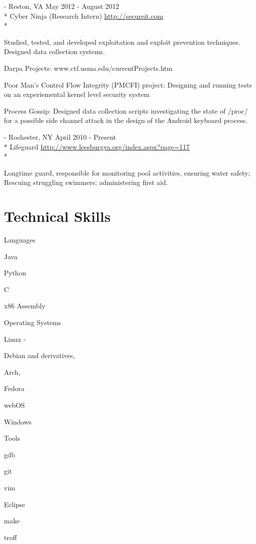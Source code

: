 \documentclass[letter,margin,line]{resume}
\newcommand{\rurl}[1]{\hfill {\footnotesize \url{#1}}}
\newcommand{\rdate}[1]{\hfill {\small #1}}
\renewcommand{\employer}[5]{\item[#1] - #2 \rdate{#3} \\* #4 \rurl{#5} \\*}
\begin{document}
\begin{resume}
\begin{asparadesc}
		\employer{SecureIT}{Reston, VA}{May 2012 - August 2012}{Cyber Ninja (Research Intern)}{http://secureit.com}

		\small
		Studied, tested, and developed exploitation and exploit prevention techniques. Designed data collection systems.
		\item Darpa Projects: \hfill www.ctf.usma.edu/currentProjects.htm
			\item Poor Man’s Control Flow Integrity (PMCFI) project: Designing and running tests on an experiemental kernel level security system
			\item Process Gossip: Designed data collection scripts investigating the state of /proc/ for a possible side channel attack in the design of the Android keyboard process.
		\normalsize
		\\
	        \employer{Town of Leesburg, Parks and Recreation}{Rochester, NY}{April 2010 - Present}{Lifeguard}{http://www.leesburgva.org/index.aspx?page=117}

	        \small
       		 Longtime guard, responsible for monitoring pool activities, ensuring water safety; Rescuing struggling swimmers; administering first aid.
		\normalsize
		\\
	\end{asparadesc}

\section{\mysidestyle Technical Skills}
	\begin{compactdesc}
		\item[Languages] \begin{inparaenum} { \small
			\item Java
			\item Python
			\item C
			\item x86 Assembly
		} \end{inparaenum}
		\item[Operating Systems] \begin{inparaenum} { \small
			\item Linux -
			\begin{inparablank}
				\item Debian and derivatives,
				\item Arch,
				\item Fedora
				\item webOS
			\end{inparablank}
			\item Windows
		} \end{inparaenum}
		\item[Tools] \begin{inparaenum} { \small
			\item gdb
			\item git
			\item vim
			\item Eclipse
			\item make
			\item troff
		} \end{inparaenum}
	\end{compactdesc}

\end{resume}
\end{document}
